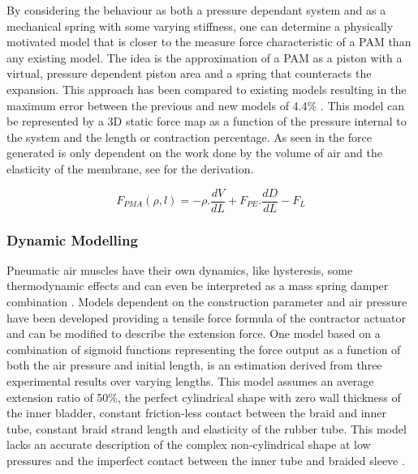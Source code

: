 \documentclass[11pt,a4paper]{article}
\begin{document}
By considering the behaviour as both a pressure dependant system and as a mechanical spring with some varying stiffness, one can determine a physically motivated model that is closer to the measure force characteristic of a PAM than any existing model. The idea is the approximation of a PAM as a piston with a virtual, pressure dependent piston area and a spring that counteracts the expansion. This approach has been compared to existing models resulting in the maximum error between the previous and new models of 4.4\% \cite{martens_boblan_2017}. This model can be represented by a 3D static force map  as a function of the pressure internal to the system and the length or contraction percentage. As seen in  the force generated is only dependent on the work done by the volume of air and the elasticity of the membrane, see  for the derivation.

\begin{equation}
F_{PMA}(\rho, l) = -\rho.\frac{dV}{dL}+F_{PE}.\frac{dD}{dL}-F_L
\label{math:staticforce}
\end{equation}

\subsubsection{Dynamic Modelling}
\label{sub:dynamic_modelling}
Pneumatic air muscles have their own dynamics, like hysteresis, some thermodynamic effects and can even be interpreted as a mass spring damper combination \cite{martens_boblan_2017}. Models dependent on the construction parameter and air pressure have been developed providing a tensile force formula of the contractor actuator and can be modified to describe the extension force. One model based on a combination of sigmoid functions representing the force output as a function of both the air pressure and initial length, is an estimation derived from three experimental results over varying lengths. This model assumes an average extension ratio of 50\%, the perfect cylindrical shape with zero wall thickness of the inner bladder, constant friction-less contact between the braid and inner tube, constant braid strand length and elasticity of the rubber tube. This model lacks an accurate description of the complex non-cylindrical shape at low pressures and the imperfect contact between the inner tube and braided sleeve \cite{al-ibadi_nefti-meziani_davis_2018}. \newline
\end{document}
